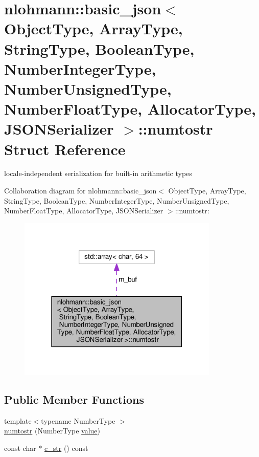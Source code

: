 \hypertarget{structnlohmann_1_1basic__json_1_1numtostr}{}\section{nlohmann\+:\+:basic\+\_\+json$<$ Object\+Type, Array\+Type, String\+Type, Boolean\+Type, Number\+Integer\+Type, Number\+Unsigned\+Type, Number\+Float\+Type, Allocator\+Type, J\+S\+O\+N\+Serializer $>$\+:\+:numtostr Struct Reference}
\label{structnlohmann_1_1basic__json_1_1numtostr}


locale-\/independent serialization for built-\/in arithmetic types  




Collaboration diagram for nlohmann\+:\+:basic\+\_\+json$<$ Object\+Type, Array\+Type, String\+Type, Boolean\+Type, Number\+Integer\+Type, Number\+Unsigned\+Type, Number\+Float\+Type, Allocator\+Type, J\+S\+O\+N\+Serializer $>$\+:\+:numtostr\+:\nopagebreak
\begin{figure}[H]
\begin{center}
\leavevmode
\includegraphics[width=271pt]{structnlohmann_1_1basic__json_1_1numtostr__coll__graph}
\end{center}
\end{figure}
\subsection*{Public Member Functions}
\begin{DoxyCompactItemize}
\item 
{\footnotesize template$<$typename Number\+Type $>$ }\\\hyperlink{structnlohmann_1_1basic__json_1_1numtostr_aae1838cf4f7bb8057a895348b8e56920}{numtostr} (Number\+Type \hyperlink{classnlohmann_1_1basic__json_af9c51328fbe1da75eca750be3009917a}{value})
\item 
const char $\ast$ \hyperlink{structnlohmann_1_1basic__json_1_1numtostr_aefbc540c4892642540a7f232fcb81448}{c\+\_\+str} () const
\end{DoxyCompactItemize}
